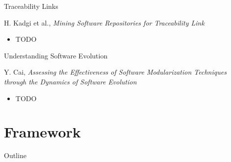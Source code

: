 \note{
}

\begin{frame}{Traceability Links}
  \begin{thebibliography}
    \beamertemplatearticlebibitems
    H. Kadgi et al., {\em Mining Software Repositories for
      Traceability Link}
  \end{thebibliography}


  \begin{itemize}
  \item TODO
  \end{itemize}
\end{frame}

\note{
}

\begin{frame}{Understanding Software Evolution}
  \begin{thebibliography}
    \beamertemplatearticlebibitems
    Y. Cai, {\em Assessing the Effectiveness of Software
      Modularization Techniques through the Dynamics of Software
      Evolution}
  \end{thebibliography}


  \begin{itemize}
  \item TODO
  \end{itemize}
\end{frame}

\note{
}


\section{Framework}

\begin{frame}{Outline}
  \tableofcontents[current]
\end{frame}

\note{
}

